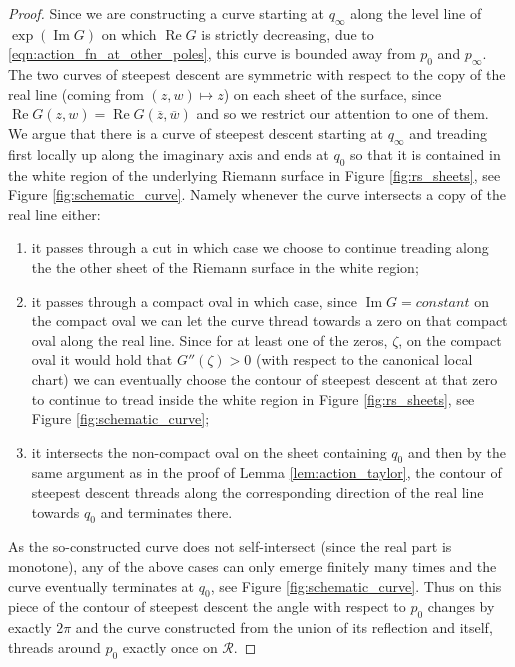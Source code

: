 \documentclass[11pt]{article}
\theoremstyle{plain}
\theoremstyle{definition}
\numberwithin{equation}{section}
\DeclareMathOperator{\im}{Im}
\DeclareMathOperator{\re}{Re}
\begin{document}
\begin{proof}
Since we are constructing a curve starting at $q_{\infty}$ along the level line of $\exp(\im G)$ on which $\re G$ is strictly decreasing, due to \eqref{eqn:action_fn_at_other_poles}, this curve is bounded away from $p_0$ and $p_{\infty}$. 
%
The two curves of steepest descent are symmetric with respect to the copy of the real line (coming from $(z,w)\mapsto z$) on each sheet of the surface, since $\re {G}(z,w)= \re G(\overline{z}, \overline{w})$ and so we restrict our attention to one of them. 
%
We argue that there is a curve of steepest descent starting at $q_{\infty}$ and treading first locally up along the imaginary axis and ends at $q_0$ so that it is contained in the white region of the underlying Riemann surface in Figure
\ref{fig:rs_sheets}, see Figure \ref{fig:schematic_curve}. 
Namely whenever the curve intersects a copy of the real line either:
\begin{enumerate}
\item it passes through a cut in which case we choose to continue treading along the the other sheet of the Riemann surface in the white region;
\item it passes through a compact oval in which case, since $\im G= constant$ on the compact oval we can let the curve thread towards a zero on that compact oval along the real line. Since for at least one of the zeros, $\zeta$, on the compact oval it would hold that $G''(\zeta)>0$ (with respect to the canonical local chart) we can eventually choose the contour of steepest descent at that zero to continue to tread inside the white region in Figure \ref{fig:rs_sheets}, see Figure \ref{fig:schematic_curve}; 
\item it intersects the non-compact oval on the sheet containing $q_0$ and then by the same argument as in the proof of Lemma \ref{lem:action_taylor}, the contour of steepest descent threads along the corresponding direction of the real line towards $q_0$ and terminates there. 
\end{enumerate}
As the so-constructed curve does not self-intersect (since the real part is monotone), any of the above cases can only emerge finitely many times and the curve eventually terminates at $q_0$, see Figure  \ref{fig:schematic_curve}.
Thus on this piece of the contour of steepest descent the angle with respect to $p_0$ changes by exactly $2\pi$ and the curve constructed from the union of its reflection and itself, threads around $p_0$ exactly once on $\mathcal{R}$.
\color{black}
\end{proof}
\end{document}
